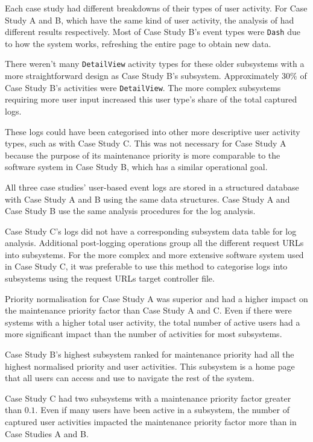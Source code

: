 Each case study had different breakdowns of their types of user activity. For Case Study A and B, which have the same kind of user activity, the analysis of  had different results respectively. Most of Case Study B's event types were \texttt{Dash} due to how the system works, refreshing the entire page to obtain new data. \par There weren't many \texttt{DetailView} activity types for these older subsystems with a more straightforward design as Case Study B's subsystem. Approximately $30\%$ of Case Study B's activities were \texttt{DetailView}. The more complex subsystems requiring more user input increased this user type's share of the total captured logs. \par These logs could have been categorised into other more descriptive user activity types, such as with Case Study C. This was not necessary for Case Study A because the purpose of its maintenance priority is more comparable to the software system in Case Study B, which has a similar operational goal. \par All three case studies' user-based event logs are stored in a structured database with Case Study A and B using the same data structures. Case Study A and Case Study B use the same analysis procedures for the log analysis. \par Case Study C's logs did not have a corresponding subsystem data table for log analysis. Additional post-logging operations group all the different request URLs into subsystems. For the more complex and more extensive software system used in Case Study C, it was preferable to use this method to categorise logs into subsystems using the request URLs target controller file. \par Priority normalisation for Case Study A was superior and had a higher impact on the maintenance priority factor than Case Study A and C. Even if there were systems with a higher total user activity, the total number of active users had a more significant impact than the number of activities for most subsystems. \par Case Study B's highest subsystem ranked for maintenance priority had all the highest normalised priority and user activities. This subsystem is a home page that all users can access and use to navigate the rest of the system. \par Case Study C had two subsystems with a maintenance priority factor greater than $0.1$. Even if many users have been active in a subsystem, the number of captured user activities impacted the maintenance priority factor more than in Case Studies A and B.

